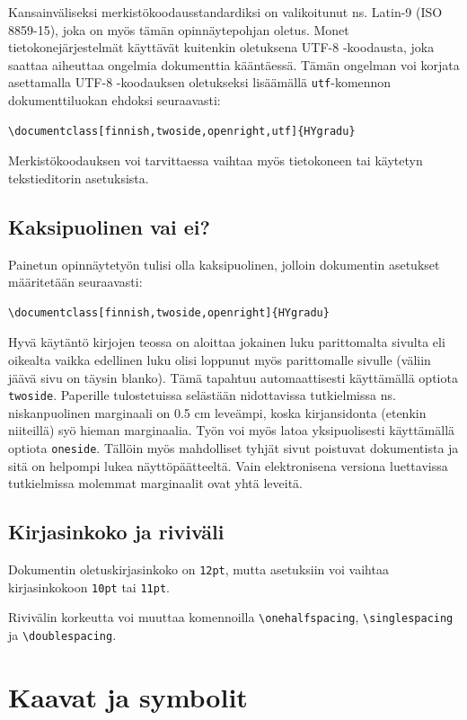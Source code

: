 \documentclass[finnish,twoside,openright,utf]{HYgradu}
\begin{document}
Kansainväliseksi merkistökoodausstandardiksi on valikoitunut ns. Latin-9 (ISO 8859-15), joka on myös tämän opinnäytepohjan oletus. Monet tietokonejärjestelmät käyttävät kuitenkin oletuksena UTF-8 -koodausta, joka saattaa aiheuttaa ongelmia dokumenttia kääntäessä. Tämän ongelman voi korjata asettamalla UTF-8 -koodauksen oletukseksi lisäämällä \texttt{utf}-komennon dokumenttiluokan ehdoksi seuraavasti:
\begin{verbatim}
\documentclass[finnish,twoside,openright,utf]{HYgradu}
\end{verbatim}
Merkistökoodauksen voi tarvittaessa vaihtaa myös tietokoneen tai käytetyn tekstieditorin asetuksista.
 
\section{Kaksipuolinen vai ei?}

Painetun opinnäytetyön tulisi olla kaksipuolinen, jolloin dokumentin asetukset määritetään seuraavasti:
\begin{verbatim}
\documentclass[finnish,twoside,openright]{HYgradu}
\end{verbatim}
Hyvä käytäntö kirjojen teossa on aloittaa jokainen luku parittomalta sivulta eli oikealta vaikka edellinen luku olisi loppunut myös parittomalle sivulle (väliin jäävä sivu on täysin blanko). Tämä tapahtuu automaattisesti käyttämällä optiota \texttt{twoside}. Paperille tulostetuissa selästään nidottavissa  tutkielmissa ns. niskanpuolinen marginaali on 0.5 cm leveämpi, koska kirjansidonta (etenkin niiteillä) syö hieman marginaalia. 
Työn voi myös latoa yksipuolisesti käyttämällä optiota \texttt{oneside}. Tällöin myös mahdolliset tyhjät sivut poistuvat dokumentista ja sitä on helpompi lukea näyttöpäätteeltä. Vain elektronisena versiona luettavissa tutkielmissa molemmat marginaalit ovat yhtä leveitä.

\section{Kirjasinkoko ja riviväli}

Dokumentin oletuskirjasinkoko on \texttt{12pt}, mutta asetuksiin voi vaihtaa kirjasinkokoon \texttt{10pt} tai \texttt{11pt}.

Rivivälin korkeutta voi muuttaa komennoilla \texttt{\textbackslash onehalfspacing}, \texttt{\textbackslash singlespacing}
 ja \texttt{\textbackslash doublespacing}.

\chapter{Kaavat ja symbolit}
\end{document}
